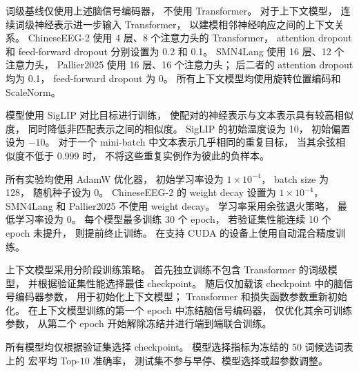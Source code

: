 词级基线仅使用上述脑信号编码器，
不使用 Transformer。
对于上下文模型，
连续词级神经表示进一步输入 Transformer，
以建模相邻神经响应之间的上下文关系。
ChineseEEG-2 使用 4 层、8 个注意力头的 Transformer，
attention dropout 和 feed-forward dropout
分别设置为 0.2 和 0.1。
SMN4Lang 使用 16 层、12 个注意力头，
Pallier2025 使用 16 层、16 个注意力头；
后二者的 attention dropout 均为 0.1，
feed-forward dropout 为 0。
所有上下文模型均使用旋转位置编码和 ScaleNorm。

模型使用 SigLIP 对比目标进行训练，
使配对的神经表示与文本表示具有较高相似度，
同时降低非匹配表示之间的相似度。
SigLIP 的初始温度设为 10，
初始偏置设为 $-10$。
对于一个 mini-batch 中文本表示几乎相同的重复目标，
当其余弦相似度不低于 0.999 时，
不将这些重复实例作为彼此的负样本。

所有实验均使用 AdamW 优化器，
初始学习率设为 $1\times10^{-4}$，
batch size 为 128，
随机种子设为 0。
ChineseEEG-2 的 weight decay 设置为 $1\times10^{-4}$，
SMN4Lang 和 Pallier2025 不使用 weight decay。
学习率采用余弦退火策略，
最低学习率设为 0。
每个模型最多训练 30 个 epoch，
若验证集性能连续 10 个 epoch 未提升，
则提前终止训练。
在支持 CUDA 的设备上使用自动混合精度训练。

上下文模型采用分阶段训练策略。
首先独立训练不包含 Transformer 的词级模型，
并根据验证集性能选择最佳 checkpoint。
随后仅加载该 checkpoint 中的脑信号编码器参数，
用于初始化上下文模型；
Transformer 和损失函数参数重新初始化。
在上下文模型训练的第一个 epoch 中冻结脑信号编码器，
仅优化其余可训练参数，
从第二个 epoch 开始解除冻结并进行端到端联合训练。

所有模型均仅根据验证集选择 checkpoint。
模型选择指标为冻结的 50 词候选词表上的
宏平均 Top-$10$ 准确率，
测试集不参与早停、模型选择或超参数调整。
